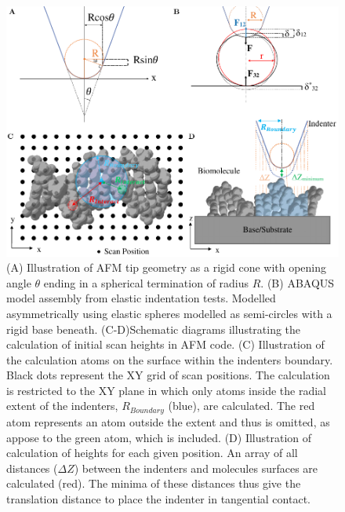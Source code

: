 \begin{figure}[ht]
    \centering
    \includegraphics[width=1\linewidth]{Figures/Figure1.pdf}    
    \caption{\label{fig: ABAQUS Model-Setup} (A) Illustration of AFM tip geometry as a rigid cone with opening angle $\theta$ ending in a spherical termination of radius $R$. (B) ABAQUS model assembly from elastic indentation tests. Modelled asymmetrically using elastic spheres modelled as semi-circles with a rigid base beneath. (C-D)Schematic diagrams illustrating the calculation of initial scan heights in AFM code. (C) Illustration of the calculation atoms on the surface within the indenters boundary. Black dots represent the XY grid of scan positions. The calculation is restricted to the XY plane in which only atoms inside the radial extent of the indenters, $R_{Boundary}$ (blue), are calculated. The red atom represents an atom outside the extent and thus is omitted, as appose to the green atom, which is included. (D) Illustration of calculation of heights for each given position. An array of all distances ($\Delta Z$) between the indenters and molecules surfaces are calculated (red). The minima of these distances thus give the translation distance to place the indenter in tangential contact.} 
\end{figure}